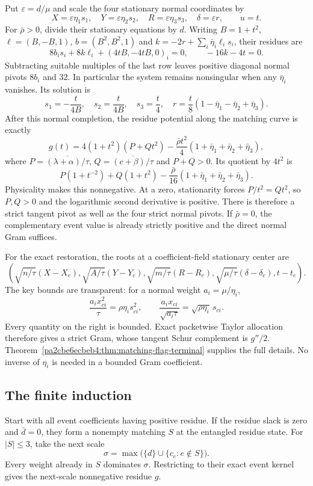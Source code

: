 Put $\varepsilon=d/\mu$ and scale the four stationary normal coordinates by
\[
 X=\varepsilon\eta_1s_1,\quad
 Y=\varepsilon\eta_2s_2,\quad
 R=\varepsilon\eta_3s_3,\quad \delta=\varepsilon r,
 \qquad u=t.
\]
For $\bar\rho>0$, divide their stationary equations by $d$.  Writing
$B=1+t^2$, $\ell=(B,-B,1)$, $b=(B^2,B^2,1)$ and
$k=-2r+\sum_i\bar\eta_i\ell_i s_i$, their residues are
\[
 8b_i s_i+8k\ell_i+(4tB,-4tB,0)_i=0,
 \qquad -16k-4t=0.
\]
Subtracting suitable multiples of the last row leaves positive diagonal
normal pivots $8b_i$ and $32$.  In particular the system remains nonsingular
when any $\bar\eta_i$ vanishes.  Its solution is
\[
 s_1=-\frac{t}{4B},\quad s_2=\frac{t}{4B},\quad s_3=\frac t4,
 \quad r=\frac t8(1-\bar\eta_1-\bar\eta_2+\bar\eta_3).
\]
After this normal completion, the residue potential along the matching
curve is exactly
\[
 g(t)=4(1+t^2)(P+Qt^2)
       -\frac{\bar\rho t^2}{4}(1+\bar\eta_1+\bar\eta_2+\bar\eta_3),
\]
where $P=\overline{(\lambda+\alpha)/\tau}$,
$Q=\overline{(c+\beta)/\tau}$ and $P+Q>0$.  Its quotient by $4t^2$ is
\begin{equation}\label{p2c3fc22497a5:eq:pp-final-circuit}
 P(1+t^{-2})+Q(1+t^2)
       -\frac{\bar\rho}{16}(1+\bar\eta_1+\bar\eta_2+\bar\eta_3).
\end{equation}
Physicality makes this nonnegative.  At a zero, stationarity forces
$P/t^2=Qt^2$, so $P,Q>0$ and the logarithmic second derivative is positive.
There is therefore a strict tangent pivot as well as the four strict normal
pivots.  If $\bar\rho=0$, the complementary event value is already strictly
positive and the direct normal Gram suffices.

For the exact restoration, the roots at a coefficient-field stationary
center are
\[
 \left(\sqrt{n/\tau}(X-X_c),\sqrt{A/\tau}(Y-Y_c),
 \sqrt{m/\tau}(R-R_c),\sqrt{\mu/\tau}(\delta-\delta_c),t-t_c\right).
\]
The key bounds are transparent: for a normal weight $a_i=\mu/\eta_i$,
\[
 \frac{a_ix_{ci}^2}{\tau}=\rho\eta_i s_{ci}^2,
 \qquad
 \frac{a_ix_{ci}}{\sqrt{a_i\tau}}=\sqrt{\rho\eta_i}\,s_{ci}.
\]
Every quantity on the right is bounded.  Exact packetwise Taylor allocation
therefore gives a strict Gram, whose tangent Schur complement is $g''/2$.
Theorem~\ref{pa2cbe6ecbeb4:thm:matching-flag-terminal} supplies the full details.  No inverse
of $\eta_i$ is needed in a bounded Gram coefficient.

\subsection{The finite induction}
Start with all event coefficients having positive residue.  If the residue
slack is zero and $\bar d=0$, they form a nonempty matching $S$ at the
entangled residue state.  For $|S|\leq3$, take the next scale
\[
             \sigma=\max\bigl(\{d\}\cup\{c_e:e\notin S\}\bigr).
\]
Every weight already in $S$ dominates $\sigma$.  Restricting to their exact
event kernel gives the next-scale nonnegative residue $g$.

